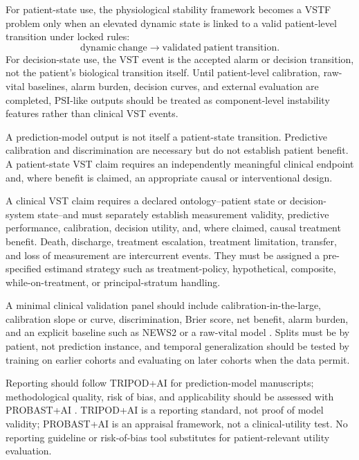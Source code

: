 \documentclass[11pt,a4paper]{article}
\newcommand{\1}{\mathbf{1}}
\begin{document}
For patient-state use, the physiological stability framework becomes a VSTF problem only when an elevated dynamic state is linked to a valid patient-level transition under locked rules:
\[
  \mathrm{dynamic\ change} \longrightarrow \mathrm{validated\ patient\ transition}.
\]
For decision-state use, the VST event is the accepted alarm or decision transition, not the patient's biological transition itself. Until patient-level calibration, raw-vital baselines, alarm burden, decision curves, and external evaluation are completed, PSI-like outputs should be treated as component-level instability features rather than clinical VST events.

A prediction-model output is not itself a patient-state transition. Predictive calibration and discrimination are necessary but do not establish patient benefit. A patient-state VST claim requires an independently meaningful clinical endpoint and, where benefit is claimed, an appropriate causal or interventional design.

A clinical VST claim requires a declared ontology--patient state or decision-system state--and must separately establish measurement validity, predictive performance, calibration, decision utility, and, where claimed, causal treatment benefit. Death, discharge, treatment escalation, treatment limitation, transfer, and loss of measurement are intercurrent events. They must be assigned a pre-specified estimand strategy such as treatment-policy, hypothetical, composite, while-on-treatment, or principal-stratum handling.

A minimal clinical validation panel should include calibration-in-the-large, calibration slope or curve, discrimination, Brier score, net benefit, alarm burden, and an explicit baseline such as NEWS2 or a raw-vital model \cite{news2,trwscore,physionet,harutyunyan2019}. Splits must be by patient, not prediction instance, and temporal generalization should be tested by training on earlier cohorts and evaluating on later cohorts when the data permit.

Reporting should follow TRIPOD+AI for prediction-model manuscripts; methodological quality, risk of bias, and applicability should be assessed with PROBAST+AI \cite{tripod,collins2024tripodai,moons2025probastai}. TRIPOD+AI is a reporting standard, not proof of model validity; PROBAST+AI is an appraisal framework, not a clinical-utility test. No reporting guideline or risk-of-bias tool substitutes for patient-relevant utility evaluation.
\end{document}
